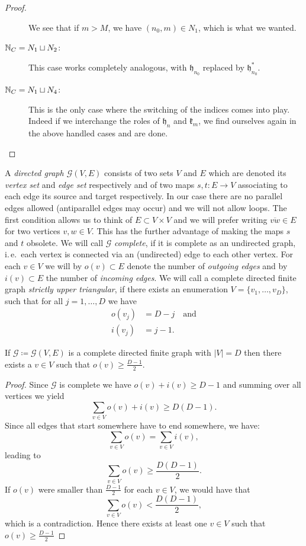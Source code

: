 \begin{proof}
\begin{description}
    We see that if \(m > M\), we have \((n_0, m) \in N_1\), which is what we wanted.
  \item[\(\mathbb{N}_C = N_1 \sqcup N_2\):] This case works completely analogous, with \(\mathfrak{h}_{n_0}\) replaced by \(\mathfrak{h}_{n_0}^\ast\).
  \item[\(\mathbb{N}_C = N_1 \sqcup N_4\):] This is the only case where the switching of the indices comes into play. Indeed if we interchange the roles of \(\mathfrak{h}_n\) and \(\mathfrak{k}_m\), we find ourselves again in the above handled cases and are done.
  \end{description}
\end{proof}

\begin{defin}
  A \emph{directed graph \(\mathcal{G}(V,E)\)} consists of two sets \(V\) and \(E\) which are denoted its \emph{vertex set} and \emph{edge set} respectively and of two maps \(s, t \colon E \to V\) associating to each edge its source and target respectively. In our case there are no parallel edges allowed (antiparallel edges may occur) and we will not allow loops. The first condition allows us to think of \(E \subset V \times V\) and we will prefer writing \(\overline{vw} \in E\) for two vertices \(v,w \in V\). This has the further advantage of making the maps \(s\) and \(t\) obsolete. We will call \(\mathcal{G}\) \emph{complete}, if it is complete as an undirected graph, i.\,e.\ each vertex is connected via an (undirected) edge to each other vertex. For each \(v \in V\) we will by \(o(v) \subset E\) denote the number of \emph{outgoing edges} and by \(i(v) \subset E\) the number of \emph{incoming edges}. We will call a complete directed finite graph \emph{strictly upper triangular}, if there exists an enumeration \(V = \{v_1, \dots, v_D\}\), such that for all \(j = 1, \dots, D\) we have
  \begin{align*}
    o(v_j) & = D - j\quad \text{and}\\
    i(v_j) & = j - 1.
  \end{align*}
\end{defin}

\begin{lemma}[{\cite[Lemma~A.6]{MR3509968}}]
  If \(\mathcal{G} \coloneqq \mathcal{G}(V,E)\) is a complete directed finite graph with \(|V| = D\) then there exists a \(v \in V\) such that \(o(v) \geq \frac{D-1}{2}\).
\end{lemma}

\begin{proof}
  Since \(\mathcal{G}\) is complete we have \(o(v) + i(v) \geq D - 1\) and summing over all vertices we yield
  \[
    \sum_{v \in V} o(v) + i(v) \geq D(D-1).
  \]
  Since all edges that start somewhere have to end somewhere, we have:
  \[
    \sum_{v \in V} o(v) = \sum_{v \in V} i(v),
  \]
  leading to
  \[
    \sum_{v \in V} o(v) \geq \frac{D(D-1)}{2}.
  \]
  If \(o(v)\) were smaller than \(\frac{D-1}{2}\) for each \(v \in V\), we would have that
  \[
    \sum_{v \in V} o(v) < \frac{D(D-1)}{2},
  \]
  which is a contradiction. Hence there exists at least one \(v \in V\) such that \(o(v) \geq \frac{D-1}{2}\)
\end{proof}

